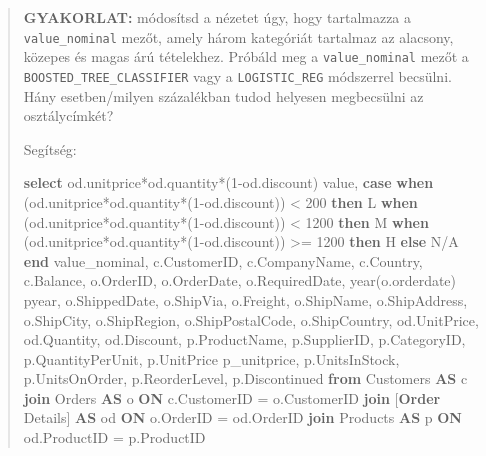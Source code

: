 \documentclass[
  magyar,
]{article}
\newenvironment{Shaded}{}{}
\newcommand{\ControlFlowTok}[1]{\textcolor[rgb]{0.00,0.44,0.13}{\textbf{#1}}}
\newcommand{\DataTypeTok}[1]{\textcolor[rgb]{0.56,0.13,0.00}{#1}}
\newcommand{\DecValTok}[1]{\textcolor[rgb]{0.25,0.63,0.44}{#1}}
\newcommand{\FunctionTok}[1]{\textcolor[rgb]{0.02,0.16,0.49}{#1}}
\newcommand{\KeywordTok}[1]{\textcolor[rgb]{0.00,0.44,0.13}{\textbf{#1}}}
\newcommand{\NormalTok}[1]{#1}
\newcommand{\OperatorTok}[1]{\textcolor[rgb]{0.40,0.40,0.40}{#1}}
\newcommand{\StringTok}[1]{\textcolor[rgb]{0.25,0.44,0.63}{#1}}
\begin{document}
\begin{quote}
\textbf{GYAKORLAT:} módosítsd a nézetet úgy, hogy tartalmazza a
\texttt{value\_nominal} mezőt, amely három kategóriát tartalmaz az
alacsony, közepes és magas árú tételekhez. Próbáld meg a
\texttt{value\_nominal} mezőt a \texttt{BOOSTED\_TREE\_CLASSIFIER} vagy
a \texttt{LOGISTIC\_REG} módszerrel becsülni. Hány esetben/milyen
százalékban tudod helyesen megbecsülni az osztálycímkét?

Segítség:

\begin{Shaded}
\begin{Highlighting}[]
\KeywordTok{select}\NormalTok{ od.unitprice}\OperatorTok{*}\NormalTok{od.quantity}\OperatorTok{*}\NormalTok{(}\DecValTok{1}\OperatorTok{{-}}\NormalTok{od.discount) }\FunctionTok{value}\NormalTok{,}
\ControlFlowTok{case} \ControlFlowTok{when}\NormalTok{ (od.unitprice}\OperatorTok{*}\NormalTok{od.quantity}\OperatorTok{*}\NormalTok{(}\DecValTok{1}\OperatorTok{{-}}\NormalTok{od.discount)) }\OperatorTok{\textless{}} \DecValTok{200} \ControlFlowTok{then} \StringTok{\textquotesingle{}L\textquotesingle{}}
      \ControlFlowTok{when}\NormalTok{ (od.unitprice}\OperatorTok{*}\NormalTok{od.quantity}\OperatorTok{*}\NormalTok{(}\DecValTok{1}\OperatorTok{{-}}\NormalTok{od.discount)) }\OperatorTok{\textless{}} \DecValTok{1200} \ControlFlowTok{then} \StringTok{\textquotesingle{}M\textquotesingle{}}
      \ControlFlowTok{when}\NormalTok{ (od.unitprice}\OperatorTok{*}\NormalTok{od.quantity}\OperatorTok{*}\NormalTok{(}\DecValTok{1}\OperatorTok{{-}}\NormalTok{od.discount)) }\OperatorTok{\textgreater{}=} \DecValTok{1200} \ControlFlowTok{then} \StringTok{\textquotesingle{}H\textquotesingle{}}
\ControlFlowTok{else} \StringTok{\textquotesingle{}N/A\textquotesingle{}} \ControlFlowTok{end}\NormalTok{ value\_nominal,}
\NormalTok{c.CustomerID, c.CompanyName, c.Country, c.Balance, o.OrderID,  o.OrderDate, o.RequiredDate,}
\DataTypeTok{year}\NormalTok{(o.orderdate) pyear,}
\NormalTok{o.ShippedDate, o.ShipVia, o.Freight, o.ShipName, o.ShipAddress, o.ShipCity, o.ShipRegion,}
\NormalTok{o.ShipPostalCode, o.ShipCountry, od.UnitPrice, od.Quantity, od.Discount,}
\NormalTok{p.ProductName, p.SupplierID, p.CategoryID,}
\NormalTok{p.QuantityPerUnit, p.UnitPrice p\_unitprice, p.UnitsInStock, p.UnitsOnOrder, p.ReorderLevel,}
\NormalTok{p.Discontinued}
\KeywordTok{from}\NormalTok{ Customers }\KeywordTok{AS}\NormalTok{ c }\KeywordTok{join}\NormalTok{ Orders }\KeywordTok{AS}\NormalTok{ o }\KeywordTok{ON}\NormalTok{ c.CustomerID }\OperatorTok{=}\NormalTok{ o.CustomerID }\KeywordTok{join}
\NormalTok{[}\KeywordTok{Order}\NormalTok{ Details] }\KeywordTok{AS}\NormalTok{ od }\KeywordTok{ON}\NormalTok{ o.OrderID }\OperatorTok{=}\NormalTok{ od.OrderID }\KeywordTok{join}
\NormalTok{Products }\KeywordTok{AS}\NormalTok{ p }\KeywordTok{ON}\NormalTok{ od.ProductID }\OperatorTok{=}\NormalTok{ p.ProductID}
\end{Highlighting}
\end{Shaded}
\end{quote}
\end{document}
